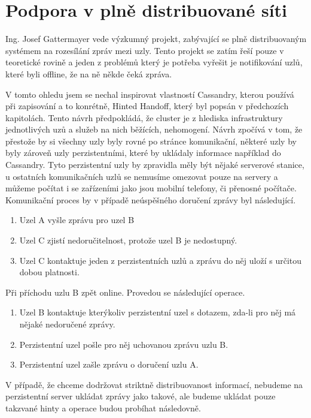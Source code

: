 \section{Podpora v plně distribuované síti}
Ing. Josef Gattermayer vede výzkumný projekt, zabývající se plně distribuovaným systémem na rozesílání zpráv mezi uzly. Tento projekt se zatím řeší pouze v teoretické rovině a jeden z problémů který je potřeba vyřešit je notifikování uzlů, které byli offline, že na ně někde čeká zpráva. 

V tomto ohledu jsem se nechal inspirovat vlastností Cassandry, kterou používá při zapisování a to konrétně, Hinted Handoff, který byl popsán v předchozích kapitolách. Tento návrh předpokládá, že cluster je z hlediska infrastruktury jednotlivých uzů a služeb na nich běžících, nehomogení. Návrh zpočívá v tom, že přestože by si všechny uzly byly rovné po stránce komunikační, některé uzly by byly zároveň uzly perzistentními, které by ukládaly informace například do Cassandry. Tyto perzistentní uzly by zpravidla měly být nějaké serverové stanice, u ostatních komunikačních uzlů se nemusíme omezovat pouze na servery a můžeme počítat i se zařízeními jako jsou mobilní telefony, či přenosné počítače. Komunikační proces by v případě neúspěšného doručení zprávy byl následující. 

\begin{enumerate}
\item Uzel A vyšle zprávu pro uzel B
\item Uzel C zjistí nedoručitelnost, protože uzel B je nedostupný.
\item Uzel C kontaktuje jeden z perzistentních uzlů a zprávu do něj uloží s určitou dobou platnosti. 
\end{enumerate}

Při příchodu uzlu B zpět online. Provedou se následující operace.

\begin{enumerate}
\item Uzel B kontaktuje kterýkoliv perzistentní uzel s dotazem, zda-li pro něj má nějaké nedoručené zprávy.
\item Perzistentní uzel pošle pro něj uchovanou zprávu uzlu B.
\item Perzistentní uzel zašle zprávu o doručení uzlu A.
\end{enumerate}


V případě, že chceme dodržovat striktně distribuovanost informací, nebudeme na perzistentní server ukládat zprávy jako takové, ale budeme ukládat pouze takzvané hinty a operace budou probíhat následovně. 


